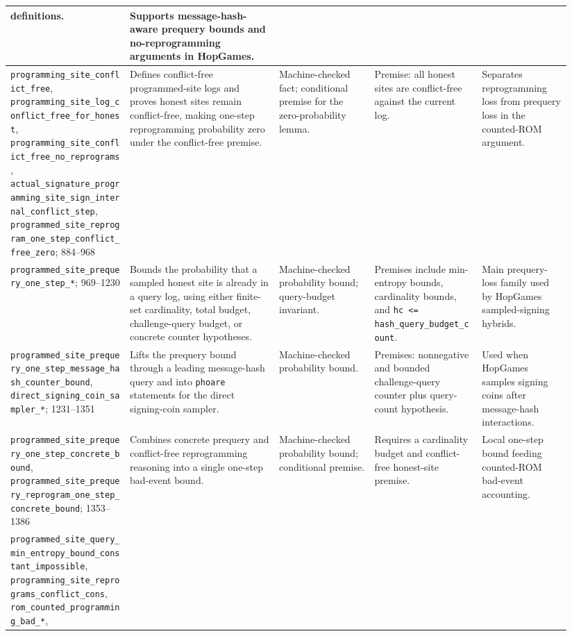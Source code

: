 \documentclass[11pt]{report}
\DeclareRobustCommand{\ec}[1]{\ifmmode\text{\nolinkurl{#1}}\else\nolinkurl{#1}\fi}
\theoremstyle{definition}
\theoremstyle{plain}
\begin{document}
\begin{longtable}{p{0.20\linewidth}p{0.25\linewidth}p{0.16\linewidth}p{0.18\linewidth}p{0.15\linewidth}}
definitions. &
Supports message-hash-aware prequery bounds and no-reprogramming arguments in
HopGames. \\
\midrule
\ec{programming\_site\_conflict\_free},
\ec{programming\_site\_log\_conflict\_free\_for\_honest},
\ec{programming\_site\_conflict\_free\_no\_reprograms},
\ec{actual\_signature\_programming\_site\_sign\_internal\_conflict\_step},
\ec{programmed\_site\_reprogram\_one\_step\_conflict\_free\_zero}; 884--968 &
Defines conflict-free programmed-site logs and proves honest sites remain
conflict-free, making one-step reprogramming probability zero under the
conflict-free premise. &
Machine-checked fact; conditional premise for the zero-probability lemma. &
Premise: all honest sites are conflict-free against the current log. &
Separates reprogramming loss from prequery loss in the counted-ROM argument. \\
\midrule
\ec{programmed\_site\_prequery\_one\_step\_*}; 969--1230 &
Bounds the probability that a sampled honest site is already in a query log,
using either finite-set cardinality, total budget, challenge-query budget, or
concrete counter hypotheses. &
Machine-checked probability bound; query-budget invariant. &
Premises include min-entropy bounds, cardinality bounds, and
\ec{hc <= hash\_query\_budget\_count}. &
Main prequery-loss family used by HopGames sampled-signing hybrids. \\
\midrule
\ec{programmed\_site\_prequery\_one\_step\_message\_hash\_counter\_bound},
\ec{direct\_signing\_coin\_sampler\_*}; 1231--1351 &
Lifts the prequery bound through a leading message-hash query and into
\ec{phoare} statements for the direct signing-coin sampler. &
Machine-checked probability bound. &
Premises: nonnegative and bounded challenge-query counter plus query-count
hypothesis. &
Used when HopGames samples signing coins after message-hash interactions. \\
\midrule
\ec{programmed\_site\_prequery\_one\_step\_concrete\_bound},
\ec{programmed\_site\_prequery\_reprogram\_one\_step\_concrete\_bound}; 1353--1386 &
Combines concrete prequery and conflict-free reprogramming reasoning into a
single one-step bad-event bound. &
Machine-checked probability bound; conditional premise. &
Requires a cardinality budget and conflict-free honest-site premise. &
Local one-step bound feeding counted-ROM bad-event accounting. \\
\midrule
\ec{programmed\_site\_query\_min\_entropy\_bound\_constant\_impossible},
\ec{programming\_site\_reprograms\_conflict\_cons},
\ec{rom\_counted\_programming\_bad\_*},

\end{longtable}
\end{document}
